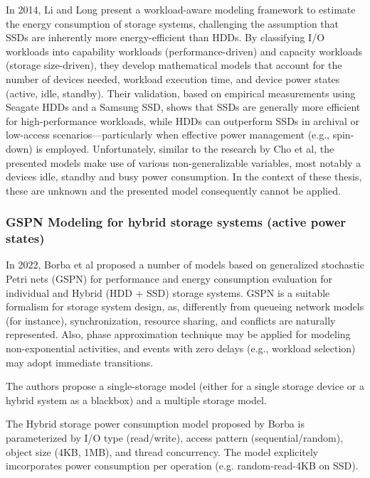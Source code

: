 In 2014, Li and Long\parencite{liWhichStorageDevice2014} present a workload-aware modeling framework to estimate the energy consumption of storage systems, challenging the assumption that SSDs are inherently more energy-efficient than HDDs. By classifying I/O workloads into capability workloads (performance-driven) and capacity workloads (storage size-driven), they develop mathematical models that account for the number of devices needed, workload execution time, and device power states (active, idle, standby). Their validation, based on empirical measurements using Seagate HDDs and a Samsung SSD, shows that SSDs are generally more efficient for high-performance workloads, while HDDs can outperform SSDs in archival or low-access scenarios—particularly when effective power management (e.g., spin-down) is employed. Unfortunately, similar to the research by Cho et al, the presented models make use of various non-generalizable variables, most notably a devices idle, standby and busy power consumption. In the context of these thesis, these are unknown and the presented model consequently cannot be applied.

\subsubsection{GSPN Modeling for hybrid storage systems (active power states)}
In 2022, Borba et al\parencite{borbaModelingApproachEstimating2022} proposed a number of models based on generalized stochastic Petri nets (GSPN) for performance and energy consumption evaluation for individual and Hybrid (HDD + SSD) storage systems. GSPN is a suitable formalism for storage system design, as, differently from queueing network models (for instance), synchronization, resource sharing, and conflicts are naturally represented. Also, phase approximation technique may be applied for modeling non-exponential activities, and events with zero delays (e.g., workload selection) may adopt immediate transitions. 

The authors propose a single-storage model (either for a single storage device or a hybrid system as a blackbox) and a multiple storage model.

The Hybrid storage power consumption model proposed by Borba is parameterized by I/O type (read/write), access pattern (sequential/random), object size (4KB, 1MB), and thread concurrency. The model explicitely imcorporates power consumption per operation (e.g. random-read-4KB on SSD).


